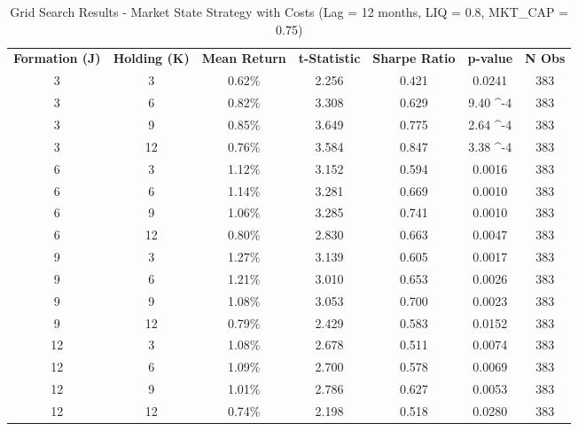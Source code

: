 \begin{table}[htbp]
\caption{Grid Search Results - Market State Strategy with Costs (Lag = 12 months, LIQ = 0.8, MKT\_CAP = 0.75)}
\label{tab:grid_search_costs_lag12}
\begin{tabular}{cc|ccccc}
\hline
\textbf{Formation (J)} & \textbf{Holding (K)} & \textbf{Mean Return} & \textbf{t-Statistic} & \textbf{Sharpe Ratio} & \textbf{p-value} & \textbf{N Obs} \\
\cline{3-7}
3 & 3 & 0.62\% & 2.256 & 0.421 & 0.0241 & 383 \\
3 & 6 & 0.82\% & 3.308 & 0.629 & 9.40 \times 10^{-4} & 383 \\
3 & 9 & 0.85\% & 3.649 & 0.775 & 2.64 \times 10^{-4} & 383 \\
3 & 12 & 0.76\% & 3.584 & 0.847 & 3.38 \times 10^{-4} & 383 \\
6 & 3 & 1.12\% & 3.152 & 0.594 & 0.0016 & 383 \\
6 & 6 & 1.14\% & 3.281 & 0.669 & 0.0010 & 383 \\
6 & 9 & 1.06\% & 3.285 & 0.741 & 0.0010 & 383 \\
6 & 12 & 0.80\% & 2.830 & 0.663 & 0.0047 & 383 \\
9 & 3 & 1.27\% & 3.139 & 0.605 & 0.0017 & 383 \\
9 & 6 & 1.21\% & 3.010 & 0.653 & 0.0026 & 383 \\
9 & 9 & 1.08\% & 3.053 & 0.700 & 0.0023 & 383 \\
9 & 12 & 0.79\% & 2.429 & 0.583 & 0.0152 & 383 \\
12 & 3 & 1.08\% & 2.678 & 0.511 & 0.0074 & 383 \\
12 & 6 & 1.09\% & 2.700 & 0.578 & 0.0069 & 383 \\
12 & 9 & 1.01\% & 2.786 & 0.627 & 0.0053 & 383 \\
12 & 12 & 0.74\% & 2.198 & 0.518 & 0.0280 & 383 \\
\hline
\end{tabular}
\end{table}
